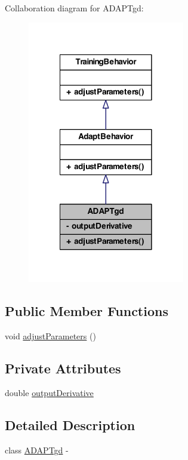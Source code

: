 Collaboration diagram for ADAPTgd:\nopagebreak
\begin{figure}[H]
\begin{center}
\leavevmode
\includegraphics[width=194pt]{class_a_d_a_p_tgd__coll__graph}
\end{center}
\end{figure}
\subsection*{Public Member Functions}
\begin{DoxyCompactItemize}
\item 
void \hyperlink{class_a_d_a_p_tgd_a61a992390f1994694918254eb49226a8}{adjustParameters} ()
\end{DoxyCompactItemize}
\subsection*{Private Attributes}
\begin{DoxyCompactItemize}
\item 
double \hyperlink{class_a_d_a_p_tgd_a1da50586ed84654472e3c73be57775c6}{outputDerivative}
\end{DoxyCompactItemize}


\subsection{Detailed Description}
class \hyperlink{class_a_d_a_p_tgd}{ADAPTgd} -\/ 

